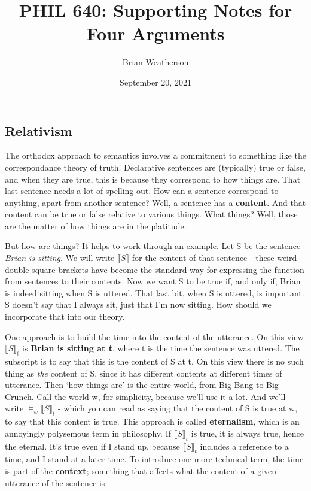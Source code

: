 \documentclass[
]{article}
\title{PHIL 640: Supporting Notes for Four Arguments}
\author{Brian Weatherson}
\date{September 20, 2021}
\begin{document}
\maketitle

\hypertarget{relativism}{%
\subsection{Relativism}\label{relativism}}

The orthodox approach to semantics involves a commitment to something
like the correspondance theory of truth. Declarative sentences are
(typically) true or false, and when they are true, this is because they
correspond to how things are. That last sentence needs a lot of spelling
out. How can a sentence correspond to anything, apart from another
sentence? Well, a sentence has a \textbf{content}. And that content can
be true or false relative to various things. What things? Well, those
are the matter of how things are in the platitude.

But how are things? It helps to work through an example. Let S be the
sentence \emph{Brian is sitting}. We will write \(⟦S⟧\) for the content
of that sentence - these weird double square brackets have become the
standard way for expressing the function from sentences to their
contents. Now we want S to be true if, and only if, Brian is indeed
sitting when S is uttered. That last bit, when S is uttered, is
important. S doesn't say that I always sit, just that I'm now sitting.
How should we incorporate that into our theory.

One approach is to build the time into the content of the utterance. On
this view \(⟦S⟧_t\) is \textbf{Brian is sitting at t}, where t is the
time the sentence was uttered. The subscript is to say that this is the
content of S at t. On this view there is no such thing as \emph{the}
content of S, since it has different contents at different times of
utterance. Then `how things are' is the entire world, from Big Bang to
Big Crunch. Call the world w, for simplicity, because we'll use it a
lot. And we'll write \(\vDash_w⟦S⟧_t\) - which you can read as saying
that the content of S is true at w, to say that this content is true.
This approach is called \textbf{eternalism}, which is an annoyingly
polysemous term in philosophy. If \(⟦S⟧_t\) is true, it is always true,
hence the eternal. It's true even if I stand up, because \(⟦S⟧_t\)
includes a reference to a time, and I stand at a later time. To
introduce one more technical term, the time is part of the
\textbf{context}; something that affects what the content of a given
utterance of the sentence is.
\end{document}
